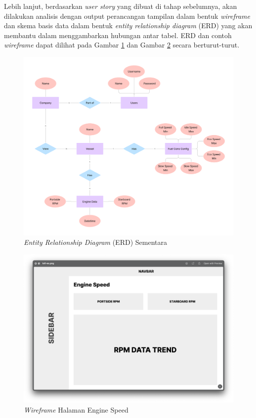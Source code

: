     Lebih lanjut, berdasarkan \textit{user story } yang dibuat di tahap sebelumnya, akan dilakukan analisis dengan output perancangan tampilan dalam bentuk \textit{wireframe} dan skema basis data dalam bentuk \textit{entity relationship diagram} (ERD) yang akan membantu dalam menggambarkan hubungan antar tabel. ERD dan contoh \textit{wireframe} dapat dilihat pada Gambar \ref{fig:erd} dan Gambar \ref{fig:wireframe} secara berturut-turut.

    \begin{figure}[!h]
        \includegraphics[width=1\linewidth, center]{images/metode/erd.png}
        \caption{\textit{Entity Relationship Diagram} (ERD) Sementara}
        \label{fig:erd}
    \end{figure}

    \begin{figure}[!h]
        \includegraphics[width=1.1\linewidth, center]{images/hasil/iterations/1/lofi-es.png}
        \caption{\textit{Wireframe} Halaman Engine Speed}
        \label{fig:wireframe}
    \end{figure}

